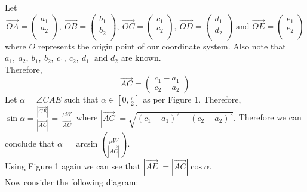 \documentclass{article}
\begin{document}
Let $$\overrightarrow{OA} = 
\begin{pmatrix}
	a_1\\
	a_2\\
\end{pmatrix}, \
\overrightarrow{OB} = 
\begin{pmatrix}
	b_1\\
	b_2\\
\end{pmatrix}, \
\overrightarrow{OC} = 
\begin{pmatrix}
	c_1\\
	c_2\\
\end{pmatrix}, \
\overrightarrow{OD} = 
\begin{pmatrix}
	d_1\\
	d_2\\
\end{pmatrix}\text{ and }
\overrightarrow{OE} = 
\begin{pmatrix}
	e_1\\
	e_2\\
\end{pmatrix}$$
where $O$ represents the origin point of our coordinate system. Also note that $a_1, \ a_2, \ b_1, \ b_2, \ c_1, \ c_2, \ d_1 \ \text{ and } d_2$ are known.\vspace{\baselineskip}\\
Therefore, $$\overrightarrow{AC} = 
\begin{pmatrix}
	c_1 - a_1\\
	c_2 - a_2
\end{pmatrix}$$
Let $\alpha = \angle CAE$ such that $\alpha \in [0, \frac{\pi}{2}]$ as per Figure 1. Therefore, $\sin{\alpha} = \frac{|\overrightarrow{CE}|}{|\overrightarrow{AC}|} = \frac{\mu W}{|\overrightarrow{AC}|}$ where $|\overrightarrow{AC}| = \sqrt{(c_1 - a_1)^2 + (c_2 - a_2)^2}.$ Therefore we can conclude that $\alpha = \arcsin{\left(\frac{\mu W}{|\overrightarrow{AC}|}\right)}$. \vspace{\baselineskip}\\
Using Figure 1 again we can see that $|\overrightarrow{AE}| = |\overrightarrow{AC}|\cos{\alpha}.$\vspace{\baselineskip}\\
Now consider the following diagram: \vspace{\baselineskip}\\
\end{document}
